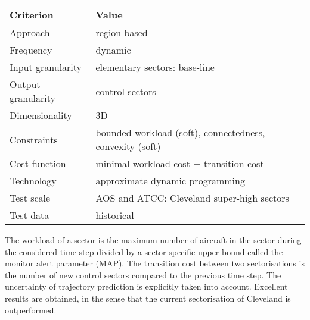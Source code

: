 \documentclass[a4paper,12pt]{article}
\begin{document}
\begin{center}
\begin{tabular}{|l|l|}
  \hline
  Criterion & Value \\
  \hline\hline
  Approach & region-based \\ \hline
  Frequency & dynamic \\ \hline
  Input granularity & elementary sectors: base-line \\ \hline
  Output granularity & control sectors \\ \hline
  Dimensionality & 3D \\ \hline
  Constraints & bounded workload (soft), connectedness,
    convexity (soft) \\ \hline
  Cost function & minimal workload cost + transition cost \\ \hline
  Technology & approximate dynamic programming \\ \hline
  Test scale & AOS and ATCC: Cleveland super-high sectors \\ \hline
  Test data & historical \\ \hline
\end{tabular}
\end{center}
The workload of a sector is the maximum number of aircraft in the
sector during the considered time step divided by a sector-specific
upper bound called the monitor alert parameter (MAP).  The transition
cost between two sectorisations is the number of new control sectors
compared to the previous time step.  The uncertainty of trajectory
prediction is explicitly taken into account.  Excellent results are
obtained, in the sense that the current sectorisation of Cleveland is
outperformed.

\subsection{\cite{Gianazza:AI10}}
\end{document}
